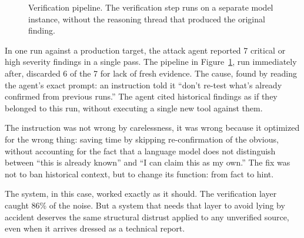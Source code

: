\documentclass[10pt]{article}
\begin{document}
\begin{figure}[h]
\centering
{}
\caption{Verification pipeline. The verification step runs on a separate model instance, without the reasoning thread that produced the original finding.}
\label{fig:verify}
\end{figure}

In one run against a production target, the attack agent reported 7 critical or high severity findings in a single pass. The pipeline in Figure~\ref{fig:verify}, run immediately after, discarded 6 of the 7 for lack of fresh evidence. The cause, found by reading the agent's exact prompt: an instruction told it ``don't re-test what's already confirmed from previous runs.'' The agent cited historical findings as if they belonged to this run, without executing a single new tool against them.

The instruction was not wrong by carelessness, it was wrong because it optimized for the wrong thing: saving time by skipping re-confirmation of the obvious, without accounting for the fact that a language model does not distinguish between ``this is already known'' and ``I can claim this as my own.'' The fix was not to ban historical context, but to change its function: from fact to hint.

The system, in this case, worked exactly as it should. The verification layer caught 86\% of the noise. But a system that needs that layer to avoid lying by accident deserves the same structural distrust applied to any unverified source, even when it arrives dressed as a technical report.
\end{document}
